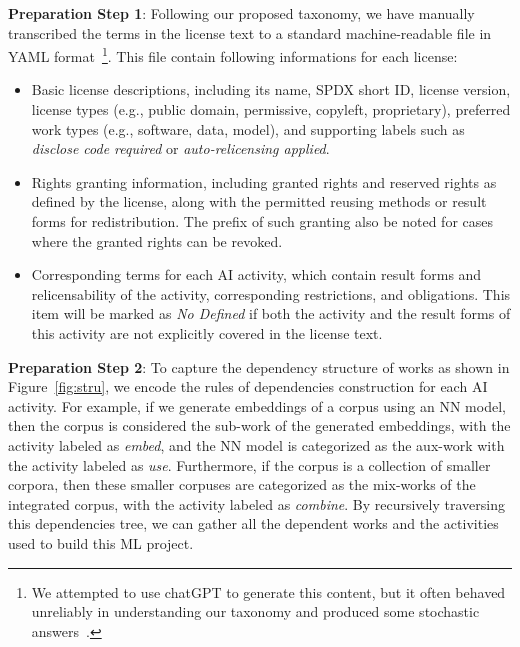 \textbf{Preparation Step 1}: Following our proposed taxonomy, we have manually transcribed the terms in the license text to a standard machine-readable file in YAML format~\footnote{We attempted to use chatGPT to generate this content, but it often behaved unreliably in understanding our taxonomy and produced some stochastic answers~\cite{bender2021dangers}.}.
This file contain following informations for each license:
\begin{itemize}[leftmargin=*]
    \item Basic license descriptions, including its name, SPDX short ID, license version, license types (e.g., public domain, permissive, copyleft, proprietary), preferred work types (e.g., software, data, model), and supporting labels such as \textit{disclose code required} or \textit{auto-relicensing applied}.
    
    \item Rights granting information, including granted rights and reserved rights as defined by the license, along with the permitted reusing methods or result forms for redistribution.
    The prefix of such granting also be noted for cases where the granted rights can be revoked.

    \item Corresponding terms for each AI activity, which contain result forms and relicensability of the activity, corresponding restrictions, and obligations. 
    This item will be marked as \textit{No Defined} if both the activity and the result forms of this activity are not explicitly covered in the license text.
\end{itemize}

\textbf{Preparation Step 2}:
To capture the dependency structure of works as shown in Figure~\ref{fig:stru}, we encode the rules of dependencies construction for each AI activity.
For example, if we generate embeddings of a corpus using an NN model, then the corpus is considered the sub-work of the generated embeddings, with the activity labeled as \textit{embed}, and the NN model is categorized as the aux-work with the activity labeled as \textit{use}.
Furthermore, if the corpus is a collection of smaller corpora, then these smaller corpuses are categorized as the mix-works of the integrated corpus, with the activity labeled as \textit{combine}.
By recursively traversing this dependencies tree, we can gather all the dependent works and the activities used to build this ML project.

